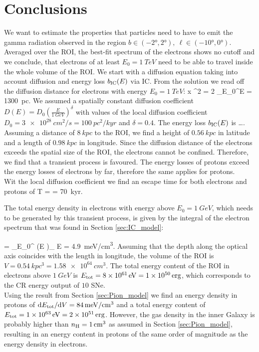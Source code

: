 \section{Conclusions}
We want to estimate the properties that particles need to have to emit the gamma radiation observed in the region $b \in (\ang{-2},\ang{2}),\ \ell \in (\ang{-10},\ang{0})$. Averaged over the ROI, the best-fit spectrum of the electrons shows no cutoff and we conclude, that electrons of at least $E_0 = \SI{1}{TeV}$ need to be able to travel inside the whole volume of the ROI.  We start with a diffusion equation taking into account diffusion and energy loss $b_{\text{IC}}(E)$ via IC. From the solution we read off the diffusion distance for electrons with energy $E_0 = \SI{1}{TeV}$:
\be
\langle x \rangle^2 = 2 \int_{E_0}^\infty {}\de E = \SI{1300}{pc}.
\ee
We assumed a spatially constant diffusion coefficient $D(E) = D_0\left(\frac{E}{\SI{1}{GeV}}\right)^\delta$ with values of the local diffusion coefficient $D_0 = \SI{3e28}{cm^2/s} = \SI{100}{pc^2/kyr}$ and $\delta = 0.4$. The energy loss $b_{\text{IC}}(E)$ is \dots.\\
Assuming a distance of $\SI{8}{kpc}$ to the ROI, we find a height of $\SI{0.56}{kpc}$ in latitude and a length of $\SI{0.98}{kpc}$ in longitude. Since the diffusion distance of the electrons exceeds the spatial size of the ROI, the electrons cannot be confined. Therefore, we find that a transient process is favoured. The energy losses of protons exceed the energy losses of electrons by far, therefore the same applies for protons.\\
Wit the local diffusion coefficient we find an escape time for both electrons and protons of 
\be
T =  = \SI{70}{kyr}.
\ee

The total energy density in electrons with energy above $E_0 = \SI{1}{GeV}$, which needs to be generated by this transient process, is given by the integral of the electron spectrum that was found in Section \ref{sec:IC_model}:

\be
{} = \int_{E_0}^{\infty} \left(E \right)_{\!\!\el} \de E = \SI{4.9}{meV/cm^3}.
\ee
Assuming that the depth along the optical axis coincides with the length in longitude, the volume of the ROI is $V = \SI{0.54}{kpc^3} = \SI{1.58e64}{cm^3}$. The total energy content of the ROI in electrons above $\SI{1}{GeV}$ is $E_{\text{tot}} = \SI{8e61}{eV} = \SI{1e50}{erg}$, which corresponds to the CR energy output of $10$ SNe.\\
Using the result from Section \ref{sec:Pion_model} we find an energy density in protons of $\text{d} E_{\text{tot}} / \text{d} V = \SI{84}{meV/cm^3}$ and a total energy content of $E_{\text{tot}} = \SI{1e63}{eV} = \SI{2e51}{erg}$. However, the gas density in the inner Galaxy is probably higher than $n_{\text{H}} = \SI{1}{/cm^3}$ as assumed in Section \ref{sec:Pion_model}, resulting in an energy content in protons of the same order of magnitude as the energy density in electrons. \\
\\

